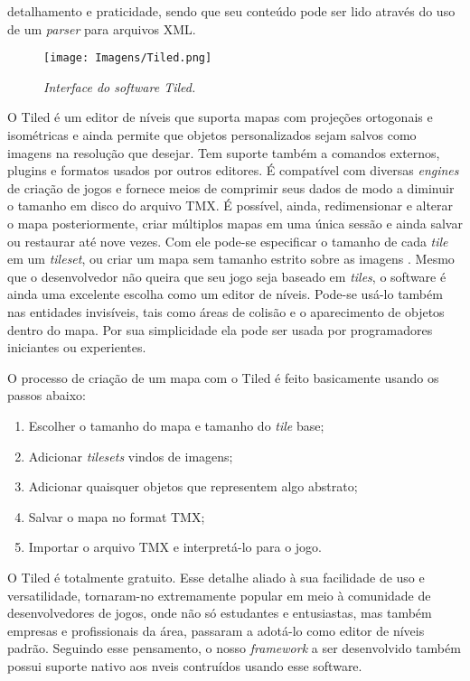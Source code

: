 detalhamento e praticidade, sendo que seu conteúdo pode ser lido através do uso de um \textit{parser} para arquivos XML.
%
\begin{figure}[H]
    \centering
    \texttt{[image: Imagens/Tiled.png]}
    \caption{\textit{Interface do \textit{software} Tiled.}}
    \label{tiled_interface}
\end{figure}
%
\par
O Tiled é um editor de níveis que suporta mapas com projeções ortogonais e isométricas e ainda permite que 
objetos personalizados sejam salvos como imagens na resolução que desejar. Tem suporte também a comandos externos, 
plugins e formatos usados por outros editores. É compatível 
com diversas \textit{engines} de criação de jogos e fornece meios de comprimir seus dados de modo a diminuir o tamanho em disco do arquivo TMX.
É possível, ainda, redimensionar e alterar o mapa posteriormente, criar múltiplos mapas em uma única sessão e ainda salvar ou 
restaurar até nove vezes. Com ele pode-se especificar o tamanho de cada \textit{tile} em um \textit{tileset}, ou criar um mapa sem tamanho estrito 
sobre as imagens \cite{TiledTutorial}.
Mesmo que o desenvolvedor não queira que seu jogo seja baseado em \textit{tiles}, o software é ainda uma excelente escolha como um editor 
de níveis. Pode-se usá-lo também nas entidades invisíveis, tais como áreas de colisão e o aparecimento de objetos dentro do 
mapa. Por sua simplicidade ela pode ser usada por programadores iniciantes ou experientes.
\par 
O processo de criação de um mapa com o Tiled é feito basicamente usando os passos abaixo:
%
\begin{enumerate}
 \item Escolher o tamanho do mapa e tamanho do \textit{tile} base;
 \item Adicionar \textit{tilesets} vindos de imagens;
 \item Adicionar quaisquer objetos que representem algo abstrato;
 \item Salvar o mapa no format TMX;
 \item Importar o arquivo TMX e interpretá-lo para o jogo.
\end{enumerate}
O Tiled é totalmente gratuito. Esse detalhe aliado à sua facilidade de uso e versatilidade, tornaram-no extremamente popular em meio
à comunidade de desenvolvedores de jogos, onde não só estudantes e entusiastas, mas também empresas e profissionais da área, passaram a adotá-lo 
como editor de níveis padrão. Seguindo esse pensamento, o nosso \textit{framework} a ser desenvolvido também possui suporte nativo
aos nveis contruídos usando esse software.
%
